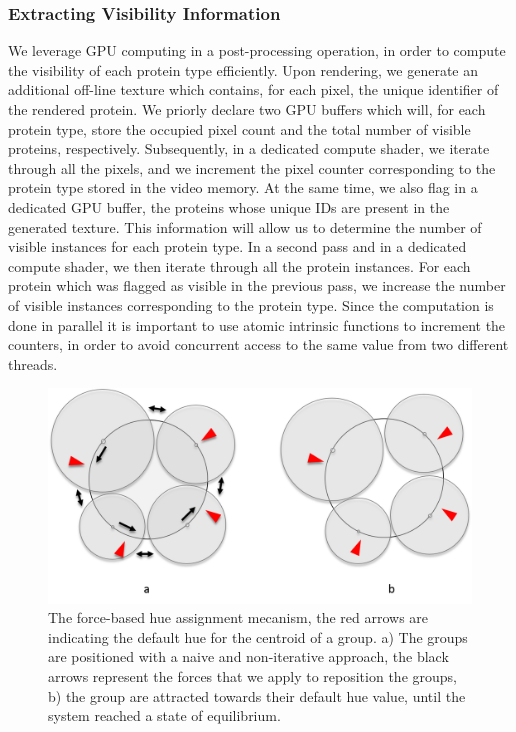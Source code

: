 \documentclass[review,journal]{vgtc}         %
\begin{document}
	\subsubsection{Extracting Visibility Information}
	\label{sssec:extracting}
	We leverage GPU computing in a post-processing operation, in order to compute the visibility of each protein type efficiently.
	Upon rendering, we generate an additional off-line texture which contains, for each pixel, the unique identifier of the rendered protein.
	We priorly declare two GPU buffers which will, for each protein type, store the occupied pixel count and the total number of visible proteins, respectively.
	Subsequently, in a dedicated compute shader, we iterate through all the pixels, and we increment the pixel counter corresponding to the protein type stored in the video memory.
	At the same time, we also flag in a dedicated GPU buffer, the proteins whose unique IDs are present in the generated texture.
	This information will allow us to determine the number of visible instances for each protein type.
	In a second pass and in a dedicated compute shader, we then iterate through all the protein instances.
	For each protein which was flagged as visible in the previous pass, we increase the number of visible instances corresponding to the protein type.
	Since the computation is done in parallel it is important to use atomic intrinsic functions to increment the counters, in order to avoid concurrent access to the same value from two different threads.
	
	\begin{figure}
		\centering
		\includegraphics[width=0.9\linewidth]{"Figures/force-based layout"}
		\caption{The force-based hue assignment mecanism, the red arrows are indicating the default hue for the centroid of a group. a) The groups are positioned with a naive and non-iterative approach, the black arrows represent the forces that we apply to reposition the groups, b) the group are attracted towards their default hue value, until the system reached a state of equilibrium.}
		\label{fig:force-basedlayout}
	\end{figure}
	
\end{document}
